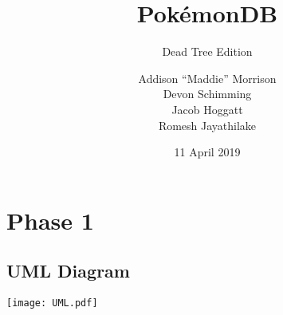 \documentclass{scrreprt}
\title{PokémonDB}
\subtitle{Dead Tree Edition}
\author{
    Addison ``Maddie'' Morrison\\
    Devon Schimming\\
    Jacob Hoggatt\\
    Romesh Jayathilake
}
\date{11 April 2019}
\begin{document}
\maketitle
\tableofcontents
\chapter{Phase 1}

\section{UML Diagram}
\texttt{[image: UML.pdf]}

\end{document}
